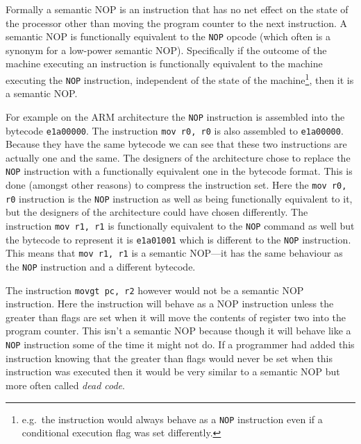 \documentclass[12pt,]{book}
\begin{document}
Formally a semantic NOP is an instruction that has no net effect on the
state of the processor other than moving the program counter to the next
instruction. A semantic NOP is functionally equivalent to the
\lstinline!NOP! opcode (which often is a synonym for a low-power
semantic NOP). Specifically if the outcome of the machine executing an
instruction is functionally equivalent to the machine executing the
\lstinline!NOP! instruction, independent of the state of the
machine\footnote{e.g.~the instruction would always behave as a
  \lstinline!NOP! instruction even if a conditional execution flag was
  set differently.}, then it is a semantic NOP.

For example on the ARM architecture\autocite{Seal:2000vd} the
\lstinline!NOP! instruction is assembled into the bytecode
\lstinline!e1a00000!. The instruction \lstinline!mov r0, r0! is also
assembled to \lstinline!e1a00000!. Because they have the same bytecode
we can see that these two instructions are actually one and the same.
The designers of the architecture chose to replace the \lstinline!NOP!
instruction with a functionally equivalent one in the bytecode format.
This is done (amongst other reasons) to compress the instruction set.
Here the \lstinline!mov r0, r0! instruction is the \lstinline!NOP!
instruction as well as being functionally equivalent to it, but the
designers of the architecture could have chosen differently. The
instruction \lstinline!mov r1, r1! is functionally equivalent to the
\lstinline!NOP! command as well but the bytecode to represent it is
\lstinline!e1a01001! which is different to the \lstinline!NOP!
instruction. This means that \lstinline!mov r1, r1! is a semantic
NOP---it has the same behaviour as the \lstinline!NOP! instruction and a
different bytecode.

The instruction \lstinline!movgt pc, r2! however would not be a semantic
NOP instruction. Here the instruction will behave as a NOP instruction
unless the greater than flags are set when it will move the contents of
register two into the program counter. This isn't a semantic NOP because
though it will behave like a \lstinline!NOP! instruction some of the
time it might not do. If a programmer had added this instruction knowing
that the greater than flags would never be set when this instruction was
executed then it would be very similar to a semantic NOP but more often
called \emph{dead code}\autocite{Collberg:1997vt}.
\end{document}
